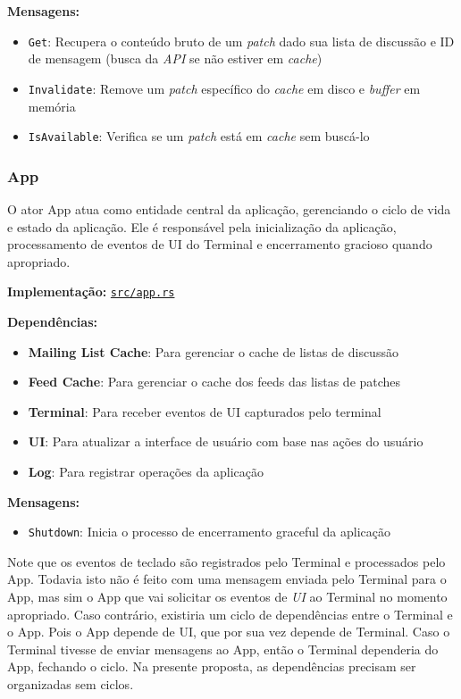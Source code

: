 \textbf{Mensagens:}

\begin{itemize}
    \item \texttt{Get}: Recupera o conteúdo bruto de um \emph{patch} dado sua lista de discussão e ID de mensagem (busca da \emph{API} se não estiver em \emph{cache})
    \item \texttt{Invalidate}: Remove um \emph{patch} específico do \emph{cache} em disco e \emph{buffer} em memória
    \item \texttt{IsAvailable}: Verifica se um \emph{patch} está em \emph{cache} sem buscá-lo
\end{itemize}

\subsubsection{App}

O ator App atua como entidade central da aplicação, gerenciando o ciclo de vida e estado da aplicação. Ele é responsável pela inicialização da aplicação, processamento de eventos de UI do Terminal e encerramento gracioso quando apropriado.

\textbf{Implementação:} \href{https://github.com/nahharris/ph-actors-tcc/blob/master/src/app.rs}{\texttt{src/app.rs}}

\textbf{Dependências:}

\begin{itemize}
    \item \textbf{Mailing List Cache}: Para gerenciar o cache de listas de discussão
    \item \textbf{Feed Cache}: Para gerenciar o cache dos feeds das listas de patches
    \item \textbf{Terminal}: Para receber eventos de UI capturados pelo terminal
    \item \textbf{UI}: Para atualizar a interface de usuário com base nas ações do usuário
    \item \textbf{Log}: Para registrar operações da aplicação
\end{itemize}

\textbf{Mensagens:}

\begin{itemize}
    \item \texttt{Shutdown}: Inicia o processo de encerramento graceful da aplicação
\end{itemize}

Note que os eventos de teclado são registrados pelo Terminal e processados pelo App. Todavia isto não é feito com uma mensagem enviada pelo Terminal para o App, mas sim o App que vai solicitar os eventos de \emph{UI} ao Terminal no momento apropriado. Caso contrário, existiria um ciclo de dependências entre o Terminal e o App. Pois o App depende de UI, que por sua vez depende de Terminal. Caso o Terminal tivesse de enviar mensagens ao App, então o Terminal dependeria do App, fechando o ciclo. Na presente proposta, as dependências precisam ser organizadas sem ciclos.
